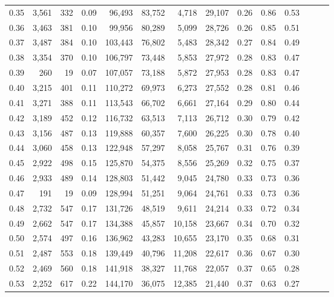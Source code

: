 \begin{tabular}{rrrrrrrrrrrrrr}
0.35 &  3,561 &    332 &  0.09 &   96,493 &   83,752 &   4,718 &  29,107 &  0.26 &  0.86 &      0.53 \\
0.36 &  3,463 &    381 &  0.10 &   99,956 &   80,289 &   5,099 &  28,726 &  0.26 &  0.85 &      0.51 \\
0.37 &  3,487 &    384 &  0.10 &  103,443 &   76,802 &   5,483 &  28,342 &  0.27 &  0.84 &      0.49 \\
0.38 &  3,354 &    370 &  0.10 &  106,797 &   73,448 &   5,853 &  27,972 &  0.28 &  0.83 &      0.47 \\
0.39 &    260 &     19 &  0.07 &  107,057 &   73,188 &   5,872 &  27,953 &  0.28 &  0.83 &      0.47 \\
0.40 &  3,215 &    401 &  0.11 &  110,272 &   69,973 &   6,273 &  27,552 &  0.28 &  0.81 &      0.46 \\
0.41 &  3,271 &    388 &  0.11 &  113,543 &   66,702 &   6,661 &  27,164 &  0.29 &  0.80 &      0.44 \\
0.42 &  3,189 &    452 &  0.12 &  116,732 &   63,513 &   7,113 &  26,712 &  0.30 &  0.79 &      0.42 \\
0.43 &  3,156 &    487 &  0.13 &  119,888 &   60,357 &   7,600 &  26,225 &  0.30 &  0.78 &      0.40 \\
0.44 &  3,060 &    458 &  0.13 &  122,948 &   57,297 &   8,058 &  25,767 &  0.31 &  0.76 &      0.39 \\
0.45 &  2,922 &    498 &  0.15 &  125,870 &   54,375 &   8,556 &  25,269 &  0.32 &  0.75 &      0.37 \\
0.46 &  2,933 &    489 &  0.14 &  128,803 &   51,442 &   9,045 &  24,780 &  0.33 &  0.73 &      0.36 \\
0.47 &    191 &     19 &  0.09 &  128,994 &   51,251 &   9,064 &  24,761 &  0.33 &  0.73 &      0.36 \\
0.48 &  2,732 &    547 &  0.17 &  131,726 &   48,519 &   9,611 &  24,214 &  0.33 &  0.72 &      0.34 \\
0.49 &  2,662 &    547 &  0.17 &  134,388 &   45,857 &  10,158 &  23,667 &  0.34 &  0.70 &      0.32 \\
0.50 &  2,574 &    497 &  0.16 &  136,962 &   43,283 &  10,655 &  23,170 &  0.35 &  0.68 &      0.31 \\
0.51 &  2,487 &    553 &  0.18 &  139,449 &   40,796 &  11,208 &  22,617 &  0.36 &  0.67 &      0.30 \\
0.52 &  2,469 &    560 &  0.18 &  141,918 &   38,327 &  11,768 &  22,057 &  0.37 &  0.65 &      0.28 \\
0.53 &  2,252 &    617 &  0.22 &  144,170 &   36,075 &  12,385 &  21,440 &  0.37 &  0.63 &      0.27 \\

\end{tabular}
